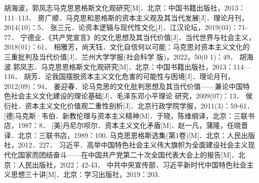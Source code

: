 \documentclass[a4paper]{ctexart}
\begin{document}
\fontsize{10pt}{13pt}\selectfont
\begin{thebibliography}{99}%
  胡海波，郭风志马克思恩格斯文化观研究[M]．北京：中国书籍出版社，2013：111--113．
  房广顺．马克思和恩格斯的资本主义观及其当代发展[J]．理论月刊，2014(10)：5．
  张三元．论资本逻辑与现代性文化[J]．江汉论坛，2019(03)：71-77．
  宁德业．《共产党宣言》的文化思想及其当代价值[J]．当代世界与社会主义，2018(01)：61．
  相雅芳，尚天钰．文化自信何以可能：马克思对资本主义文化的三重批判及当代价值[J]．兰州大学学报(社会科学 版)，2022，50(0 1)：49．
  胡海波.郭凤志．马克思恩格斯文化观研究[M]．北京：中国书籍出版社，2013：114—116．
  胡芳．沦我国摆脱资本主义文化危害的可能性与困境[J]．理论月刊，2012(09)：94．
  姜迎春．论马克思的文化批判思想及其当代价值——兼论中国特色社会主义文化建设的理论基础[J]．毛泽东邓小平理论 研究，2009(07)：13．
  侯衍社．资本主义文化价值观二重性剖析[J]．北京行政学院学报，2011(3)：59-61．
  [德]马克斯·韦伯．新教伦理与资本主义精神[M]．于晓，陈维纲译，北京：三联书店，1987：8．
  [美]丹尼尔呗尔．资本主义文化矛盾[M]．赵一凡，蒲隆，任晓晋译．北京：三联书店，1989：100.
  马克思恩格斯选集(第1卷)[M]．北京：人民出版社，2012．227．
  习近平．高举中国特色社会主义伟大旗帜\quad 为全面建设社会主义现代化国家而团结奋斗------在中国共产党第二十次全国代表大会上的报告[M]．北京：人民出版社，2022：42-43．
  中共中央宣传部．习近平新时代中国特色社会主义思想三十讲[M]．北京：学习出版社，2019：203.
\end{thebibliography}
\end{document}
